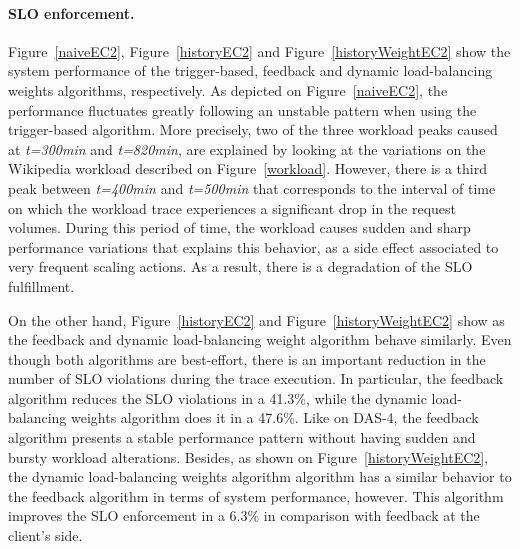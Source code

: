 
\paragraph{SLO enforcement.}
Figure~\ref{naiveEC2}, Figure~\ref{historyEC2} and Figure~\ref{historyWeightEC2} show the system performance of the trigger-based, feedback and dynamic load-balancing weights algorithms, respectively. As depicted on Figure~\ref{naiveEC2}, the performance fluctuates greatly following an unstable pattern when using the trigger-based algorithm. More precisely, two of the three workload peaks caused at \emph{t=300min} and \emph{t=820min}, are explained by looking at the variations on the Wikipedia workload described on Figure~\ref{workload}. However, there is a third peak between \emph{t=400min} and \emph{t=500min} that corresponds to the interval of time on which the workload trace experiences a significant drop in the request volumes. During this period of time, the workload causes sudden and sharp performance variations that explains this behavior, as a side effect associated to very frequent scaling actions. As a result, there is a degradation of the SLO fulfillment. 

On the other hand, Figure~\ref{historyEC2} and Figure~\ref{historyWeightEC2} show as the feedback and dynamic load-balancing weight algorithm behave similarly. Even though both algorithms are best-effort, there is an important reduction in the number of SLO violations during the trace execution. In particular, the feedback algorithm reduces the SLO violations in a  41.3\%, while the dynamic load-balancing weights algorithm does it in a 47.6\%. Like on DAS-4, the feedback algorithm presents a stable performance pattern without having sudden and bursty workload alterations. Besides, as shown on Figure~\ref{historyWeightEC2}, the dynamic load-balancing weights algorithm algorithm has a similar behavior to the feedback algorithm in terms of system performance, however. This algorithm improves the SLO enforcement in a 6.3\% in comparison with feedback at the client's side. 




